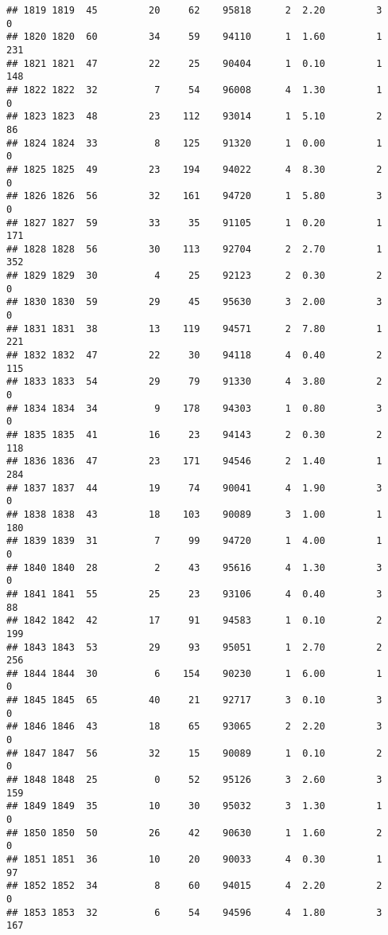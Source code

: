 \documentclass[
]{article}
\begin{document}
\begin{verbatim}
## 1819 1819  45         20     62    95818      2  2.20         3        0
## 1820 1820  60         34     59    94110      1  1.60         1      231
## 1821 1821  47         22     25    90404      1  0.10         1      148
## 1822 1822  32          7     54    96008      4  1.30         1        0
## 1823 1823  48         23    112    93014      1  5.10         2       86
## 1824 1824  33          8    125    91320      1  0.00         1        0
## 1825 1825  49         23    194    94022      4  8.30         2        0
## 1826 1826  56         32    161    94720      1  5.80         3        0
## 1827 1827  59         33     35    91105      1  0.20         1      171
## 1828 1828  56         30    113    92704      2  2.70         1      352
## 1829 1829  30          4     25    92123      2  0.30         2        0
## 1830 1830  59         29     45    95630      3  2.00         3        0
## 1831 1831  38         13    119    94571      2  7.80         1      221
## 1832 1832  47         22     30    94118      4  0.40         2      115
## 1833 1833  54         29     79    91330      4  3.80         2        0
## 1834 1834  34          9    178    94303      1  0.80         3        0
## 1835 1835  41         16     23    94143      2  0.30         2      118
## 1836 1836  47         23    171    94546      2  1.40         1      284
## 1837 1837  44         19     74    90041      4  1.90         3        0
## 1838 1838  43         18    103    90089      3  1.00         1      180
## 1839 1839  31          7     99    94720      1  4.00         1        0
## 1840 1840  28          2     43    95616      4  1.30         3        0
## 1841 1841  55         25     23    93106      4  0.40         3       88
## 1842 1842  42         17     91    94583      1  0.10         2      199
## 1843 1843  53         29     93    95051      1  2.70         2      256
## 1844 1844  30          6    154    90230      1  6.00         1        0
## 1845 1845  65         40     21    92717      3  0.10         3        0
## 1846 1846  43         18     65    93065      2  2.20         3        0
## 1847 1847  56         32     15    90089      1  0.10         2        0
## 1848 1848  25          0     52    95126      3  2.60         3      159
## 1849 1849  35         10     30    95032      3  1.30         1        0
## 1850 1850  50         26     42    90630      1  1.60         2        0
## 1851 1851  36         10     20    90033      4  0.30         1       97
## 1852 1852  34          8     60    94015      4  2.20         2        0
## 1853 1853  32          6     54    94596      4  1.80         3      167

\end{verbatim}
\end{document}
